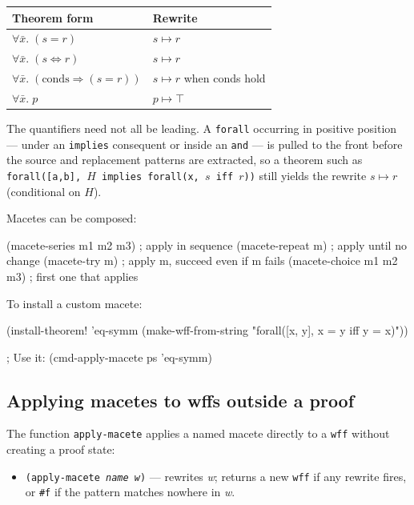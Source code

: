 \begin{center}
\begin{tabular}{ll}
\toprule
Theorem form & Rewrite \\
\midrule
$\forall\bar{x}.\;(s = r)$ & $s \mapsto r$ \\
$\forall\bar{x}.\;(s \Leftrightarrow r)$ & $s \mapsto r$ \\
$\forall\bar{x}.\;(\text{conds} \Rightarrow (s = r))$ & $s \mapsto r$ when conds hold \\
$\forall\bar{x}.\;p$ & $p \mapsto \top$ \\
\bottomrule
\end{tabular}
\end{center}

The quantifiers need not all be leading.  A \texttt{forall} occurring in
positive position --- under an \texttt{implies} consequent or inside an
\texttt{and} --- is pulled to the front before the source and replacement
patterns are extracted, so a theorem such as
\texttt{forall([a,b], $H$ implies forall(x, $s$ iff $r$))} still yields the
rewrite $s \mapsto r$ (conditional on $H$).

Macetes can be composed:
\begin{VNBcode}
(macete-series m1 m2 m3)   ; apply in sequence
(macete-repeat m)           ; apply until no change
(macete-try m)              ; apply m, succeed even if m fails
(macete-choice m1 m2 m3)   ; first one that applies
\end{VNBcode}

To install a custom macete:
\begin{VNBcode}
(install-theorem! 'eq-symm
  (make-wff-from-string "forall([x, y], x = y iff y = x)"))

; Use it:
(cmd-apply-macete ps 'eq-symm)
\end{VNBcode}

\subsection{Applying macetes to wffs outside a proof}

\begin{sloppypar}The function \texttt{apply-macete} applies a named macete directly to a
\texttt{wff} without creating a proof state:\end{sloppypar}

\begin{itemize}
\item \texttt{(apply-macete \textit{name} \textit{w})} --- rewrites \textit{w};
  returns a new \texttt{wff} if any rewrite fires, or \texttt{\#f} if the
  pattern matches nowhere in \textit{w}.
\end{itemize}

